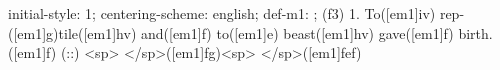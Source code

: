 initial-style: 1;
centering-scheme: english;
def-m1: \grealign;
(f3) 1. To([em1]iv) rep-([em1]g)tile([em1]hv) and([em1]f) to([em1]e) beast([em1]hv) gave([em1]f) birth.([em1]f) (::) <sp> </sp>([em1]fg)<sp> </sp>([em1]fef)